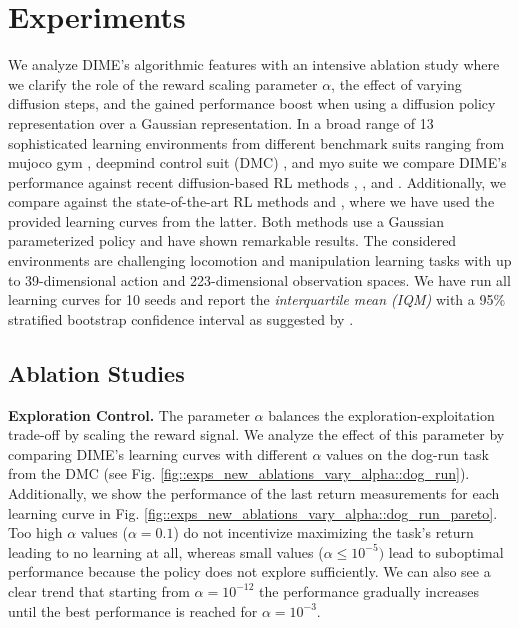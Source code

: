 \section{Experiments}
We analyze DIME's algorithmic features with an intensive ablation study where we clarify the role of the reward scaling parameter $\alpha$, the effect of varying diffusion steps, and the gained performance boost when using a diffusion policy representation over a Gaussian representation. 
In a broad range of 13 sophisticated learning environments from different benchmark suits ranging from mujoco gym \cite{gymopenai}, deepmind control suit (DMC) \cite{dmcontrol}, and myo suite \cite{MyoSuite2022} we compare DIME's performance against recent diffusion-based RL methods  \cite{psenkalearning},  \cite{wang2023diffusion},  \cite{dingconsistency} and  \cite{yang2023policy}. Additionally, we compare against the state-of-the-art RL methods  \cite{bhattcrossq} and  \cite{nauman2024bigger}, where we have used the provided learning curves from the latter. Both methods use a Gaussian parameterized policy and have shown remarkable results. The considered environments are challenging locomotion and manipulation learning tasks with up to 39-dimensional action and 223-dimensional observation spaces.  
We have run all learning curves for 10 seeds and report the \textit{interquartile mean (IQM)} with a 95\% stratified bootstrap confidence interval as suggested by \citet{agarwal2021deep}.

\subsection{Ablation Studies}
\textbf{Exploration Control.} The parameter $\alpha$ balances the exploration-exploitation trade-off by scaling the reward signal. We analyze the effect of this parameter by comparing DIME's learning curves with different $\alpha$ values on the dog-run task from the DMC (see Fig. \ref{fig::exps_new_ablations_vary_alpha::dog_run}). Additionally, we show the performance of the last return measurements for each learning curve in Fig. \ref{fig::exps_new_ablations_vary_alpha::dog_run_pareto}. Too high $\alpha$ values ($\alpha=0.1$) do not incentivize maximizing the task's return leading to no learning at all, whereas small values ($\alpha\leq10^{-5})$ lead to suboptimal performance because the policy does not explore sufficiently. We can also see a clear trend that starting from $\alpha=10^{-12}$ the performance gradually increases until the best performance is reached for $\alpha=10^{-3}$. 

